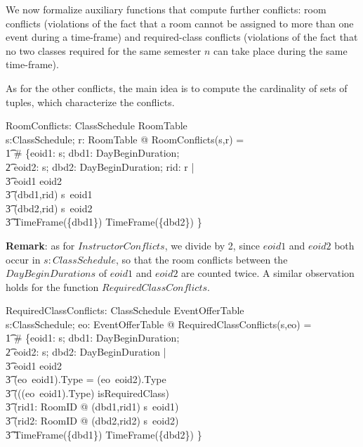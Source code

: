 \documentclass[a4paper]{article}
\begin{document}
We now formalize auxiliary functions that compute further conflicts: room
conflicts (violations of the fact that a room cannot be assigned to more than
one event during a time-frame) and required-class conflicts (violations of the
fact that no two classes required for the same semester $n$ can take place
during the same time-frame).

As for the other conflicts, the main idea is to compute the cardinality of sets
of tuples, which characterize the conflicts.

\begin{axdef}
  RoomConflicts: ClassSchedule \cross RoomTable \fun \nat \\
  \where
  \forall s:ClassSchedule; r: RoomTable @ RoomConflicts(s,r) = \\
  \t1 \# \{eoid1: \dom s; dbd1: DayBeginDuration; \\
  \t2 eoid2: \dom s; dbd2: DayBeginDuration; rid: \dom r | \\
  \t3 eoid1 \neq eoid2 \land \\
  \t3 (dbd1,rid) \in s~eoid1 \land \\
  \t3 (dbd2,rid) \in s~eoid2 \land \\
  \t3 TimeFrame(\{dbd1\}) \cap TimeFrame(\{dbd2\}) \neq \emptyset\}  \\
\end{axdef}

\noindent
{\bf Remark}: as for $InstructorConflicts$, we divide by 2, since $eoid1$ and
$eoid2$ both occur in $s: ClassSchedule$, so that the room conflicts between the
$DayBeginDurations$ of $eoid1$ and $eoid2$ are counted twice. A similar
observation holds for the function $RequiredClassConflicts$.
\begin{axdef}
  RequiredClassConflicts: ClassSchedule \cross EventOfferTable \fun \nat \\
  \where 
  \forall s:ClassSchedule; eo: EventOfferTable @ RequiredClassConflicts(s,eo) = \\
  \t1 \# \{eoid1: \dom s; dbd1: DayBeginDuration; \\
  \t2 eoid2: \dom s; dbd2: DayBeginDuration | \\
  \t3 eoid1 \neq eoid2 \land \\
  \t3 (eo~eoid1).Type = (eo~eoid2).Type \land \\
  \t3 (((eo~eoid1).Type) \in isRequiredClass) \land \\ 
  \t3 (\exists rid1: RoomID @ (dbd1,rid1) \in s~eoid1) \land \\
  \t3 (\exists rid2: RoomID @ (dbd2,rid2) \in s~eoid2) \land\\
  \t3 TimeFrame(\{dbd1\}) \cap TimeFrame(\{dbd2\}) \neq \emptyset\}  \\
\end{axdef}
\end{document}
